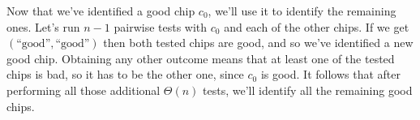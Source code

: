 Now that we've identified a good chip $c_0$, we'll use it to identify the remaining ones.
Let's run $n-1$ pairwise tests with $c_0$ and each of the other chips.
If we get $(\text{``good''},\text{``good''})$ then both tested chips are good, and so we've identified a new good chip.
Obtaining any other outcome means that at least one of the tested chips is bad, so it has to be the other one, since $c_0$ is good.
It follows that after performing all those additional $\Theta(n)$ tests, we'll identify all the remaining good chips.
